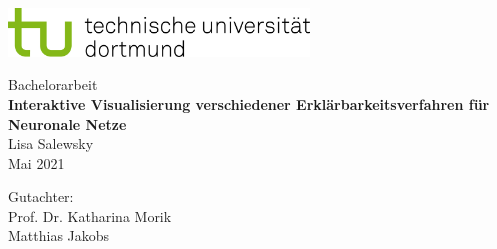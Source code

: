 \begin{titlepage}
\vspace*{-2cm}
\newlength{\links}
\setlength{\links}{-1.5cm}
\sffamily
\hspace*{\links}
\begin{minipage}{12.5cm}
\includegraphics[width=8cm]{bilder/tud_logo_rgb}
\end{minipage}

\vspace*{4cm}

\hspace*{\links}
\hspace*{-0.2cm}
\begin{minipage}{9cm}
\large
\begin{center}
{\Large Bachelorarbeit} \\
\vspace*{1cm}
\textbf{Interaktive Visualisierung verschiedener Erklärbarkeitsverfahren für Neuronale Netze} \\
\vspace*{1cm}
Lisa Salewsky\\
Mai 2021
\end{center}
\end{minipage}
\normalsize
\vspace*{5.5cm}


\vspace*{2.1cm}

\hspace*{\links}
\begin{minipage}[b]{5cm}
\raggedright
Gutachter: \\
Prof. Dr. Katharina Morik \\
Matthias Jakobs\\
\end{minipage}


\end{titlepage}

